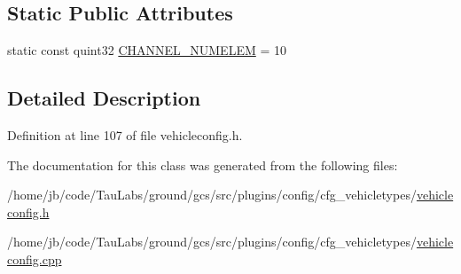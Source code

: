 \subsection*{\-Static \-Public \-Attributes}
\begin{DoxyCompactItemize}
\item 
static const quint32 \hyperlink{group___config_plugin_ga1d29d6e305c146323af055bb3657059f}{\-C\-H\-A\-N\-N\-E\-L\-\_\-\-N\-U\-M\-E\-L\-E\-M} = 10
\end{DoxyCompactItemize}


\subsection{\-Detailed \-Description}


\-Definition at line 107 of file vehicleconfig.\-h.



\-The documentation for this class was generated from the following files\-:\begin{DoxyCompactItemize}
\item 
/home/jb/code/\-Tau\-Labs/ground/gcs/src/plugins/config/cfg\-\_\-vehicletypes/\hyperlink{vehicleconfig_8h}{vehicleconfig.\-h}\item 
/home/jb/code/\-Tau\-Labs/ground/gcs/src/plugins/config/cfg\-\_\-vehicletypes/\hyperlink{vehicleconfig_8cpp}{vehicleconfig.\-cpp}\end{DoxyCompactItemize}
